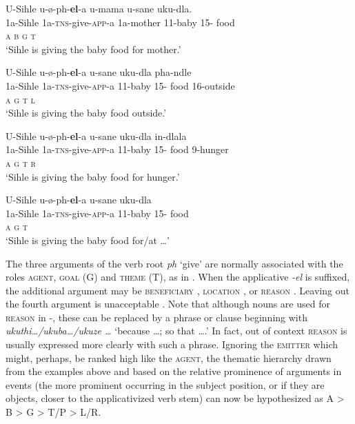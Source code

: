 \documentclass[output=paper]{langsci/langscibook}
\begin{document}
\ex
\gll U-Sihle u-ø-ph-\textbf{el}-a u-mama u-sane uku-dla. \\
 1a-Sihle 1a-\textsc{tns}-give-\textsc{app}-a 1a-mother 11-baby 15- food \\
 \textsc{a b g t }\\
\glt ‘Sihle is giving the baby food for mother.’


\ex
\gll U-Sihle u-ø-ph-\textbf{el}-a u-sane uku-dla pha-ndle \\
 1a-Sihle 1a-\textsc{tns}-give-\textsc{app}-a 11-baby 15- food 16-outside\\
 \textsc{a g t l}\\
\glt ‘Sihle is giving the baby food outside.’


\ex
\gll U-Sihle u-ø-ph-\textbf{el}-a u-sane uku-dla in-dlala \\
 1a-Sihle 1a-\textsc{tns}-give-\textsc{app}-a 11-baby 15- food 9-hunger\\
 \textsc{a g t r }\\
\glt ‘Sihle is giving the baby food for hunger.’

\ex
\gll *U-Sihle u-ø-ph-\textbf{el}-a u-sane uku-dla \\
 1a-Sihle 1a-\textsc{tns}-give-\textsc{app}-a 11-baby 15- food \\
 \textsc{a g t}\\
\glt ‘Sihle is giving the baby food for/at …’
\z
\z


The three arguments of the verb root \textit{ph} ‘give’ are normally associated with the roles \textsc{agent}, \textsc{goal} (G) and \textsc{theme} (T), as in . When the applicative \textit{-el} is suffixed, the additional argument may be \textsc{beneficiary} , \textsc{location} , or \textsc{reason} . Leaving out the fourth argument is unacceptable . Note that although nouns are used for \textsc{reason} in -, these can be replaced by a phrase or clause beginning with \textit{ukuthi…/ukuba…/ukuze …} ‘because …; so that ….’ In fact, out of context \textsc{reason} is usually expressed more clearly with such a phrase. Ignoring the \textsc{emitter} which might, perhaps, be ranked high like the \textsc{agent}, the thematic hierarchy drawn from the examples above and based on the relative prominence of arguments in events (the more prominent occurring in the subject position, or if they are objects, closer to the applicativized verb stem) can now be hypothesized as A > B > G > T/P > L/R. 
\end{document}
